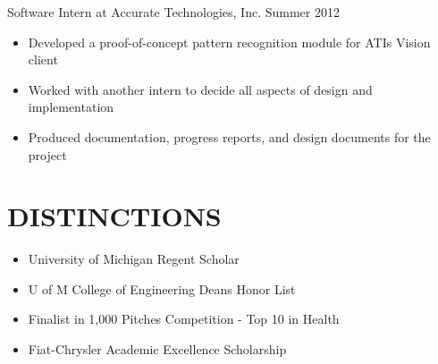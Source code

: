 \documentclass[line,margin]{res}
\begin{document}
\begin{resume}
                {\sc Software Intern at Accurate Technologies, Inc.} \hfill            Summer 2012
                 \begin{itemize}  \itemsep -2pt %
                 \item Developed a proof-of-concept pattern recognition module for ATI\textquotesingle s Vision client
                 \item Worked with another intern to decide all aspects of design and implementation
                 \item Produced documentation, progress reports, and design documents for the project
                 \end{itemize} 

\section{\textcolor{HeaderColor}{DISTINCTIONS}}
    \begin{itemize} \itemsep-0.2em
    \item University of Michigan Regent Scholar
    \item U of M College of Engineering Dean\textquotesingle s Honor List
    \item Finalist in 1,000 Pitches Competition - Top 10 in Health
    \item Fiat-Chrysler Academic Excellence Scholarship
    \end{itemize}
 

\end{resume}
\end{document}
